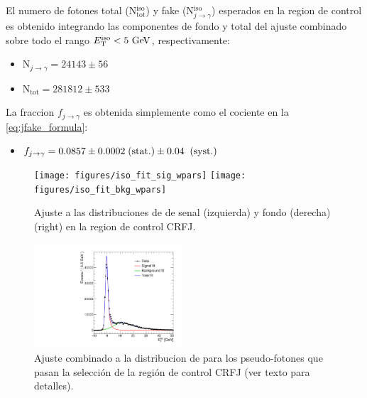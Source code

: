 El numero de fotones total (N$_\text{tot}^\text{iso}$) y fake (N$_{j\to\gamma}^\text{iso}$)
esperados en la region de control es obtenido integrando
las componentes de fondo y total del ajuste combinado sobre todo el rango
$\etiso<5\gev$, respectivamente:

\begin{itemize}
\item[] N$_{j\to\gamma}= 24143 \pm 56$

\item[] N$_\text{tot}= 281812 \pm 533$
\end{itemize}

La fraccion $f_{j\to \gamma}$ es obtenida simplemente como el cociente
en la \cref{eq:jfake_formula}:

\begin{itemize}
\item[] $f_{j\rightarrow\gamma} = 0.0857 \pm 0.0002 \mbox{$\;$(stat.)} \pm 0.04 \;\mbox{$\;$(syst.)}$
\end{itemize}

\begin{figure}[h]
  \begin{center}
  \texttt{[image: figures/iso\_fit\_sig\_wpars]}  \hfill
  \texttt{[image: figures/iso\_fit\_bkg\_wpars]}
  \caption{Ajuste a las distribuciones de {\etiso} de senal
    (izquierda) y fondo (derecha) (right) en la region
    de control CRFJ.}
  \label{fig:jetfake_sigbkg}
  \end{center}
\end{figure}

\begin{figure}[h]
  \begin{center}
  \includegraphics[width=0.49\textwidth]{figures/iso_fit_sarange}
  \caption{Ajuste combinado a la distribucion de {\etiso}
    para los pseudo-fotones que pasan la selección de la región
    de control CRFJ (ver texto para detalles).}
  \label{fig:jetfake_combfit}
  \end{center}
\end{figure}

